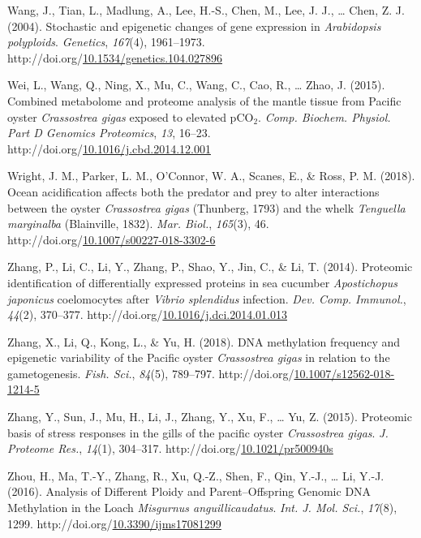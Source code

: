 \documentclass [11pt, proquest] {uwthesis}[2015/03/03]
\newlength{\cslhangindent}
\newenvironment{CSLReferences}%
{\setlength{\parindent}{0pt}%
\everypar{\setlength{\hangindent}{\cslhangindent}}\ignorespaces}%
{\par}
\begin{document}
\begin{CSLReferences}{1}{0}
\leavevmode\hypertarget{ref-Wang2004}{}%
Wang, J., Tian, L., Madlung, A., Lee, H.-S., Chen, M., Lee, J. J., \ldots{} Chen, Z. J. (2004). {Stochastic and epigenetic changes of gene expression in \emph{Arabidopsis polyploids}}. \emph{Genetics}, \emph{167}(4), 1961--1973. http://doi.org/\href{https://doi.org/10.1534/genetics.104.027896}{10.1534/genetics.104.027896}

\leavevmode\hypertarget{ref-Wei2015}{}%
Wei, L., Wang, Q., Ning, X., Mu, C., Wang, C., Cao, R., \ldots{} Zhao, J. (2015). {Combined metabolome and proteome analysis of the mantle tissue from Pacific oyster \emph{Crassostrea gigas} exposed to elevated {pCO\(_2\)}}. \emph{Comp. Biochem. Physiol. Part D Genomics Proteomics}, \emph{13}, 16--23. http://doi.org/\href{https://doi.org/10.1016/j.cbd.2014.12.001}{10.1016/j.cbd.2014.12.001}

\leavevmode\hypertarget{ref-Wright2018}{}%
Wright, J. M., Parker, L. M., O'Connor, W. A., Scanes, E., \& Ross, P. M. (2018). {Ocean acidification affects both the predator and prey to alter interactions between the oyster \emph{Crassostrea gigas} (Thunberg, 1793) and the whelk \emph{Tenguella marginalba} (Blainville, 1832)}. \emph{Mar. Biol.}, \emph{165}(3), 46. http://doi.org/\href{https://doi.org/10.1007/s00227-018-3302-6}{10.1007/s00227-018-3302-6}

\leavevmode\hypertarget{ref-Zhang2014}{}%
Zhang, P., Li, C., Li, Y., Zhang, P., Shao, Y., Jin, C., \& Li, T. (2014). {Proteomic identification of differentially expressed proteins in sea cucumber \emph{Apostichopus japonicus} coelomocytes after \emph{Vibrio splendidus} infection}. \emph{Dev. Comp. Immunol.}, \emph{44}(2), 370--377. http://doi.org/\href{https://doi.org/10.1016/j.dci.2014.01.013}{10.1016/j.dci.2014.01.013}

\leavevmode\hypertarget{ref-Zhang2018}{}%
Zhang, X., Li, Q., Kong, L., \& Yu, H. (2018). {DNA methylation frequency and epigenetic variability of the Pacific oyster \emph{Crassostrea gigas} in relation to the gametogenesis}. \emph{Fish. Sci.}, \emph{84}(5), 789--797. http://doi.org/\href{https://doi.org/10.1007/s12562-018-1214-5}{10.1007/s12562-018-1214-5}

\leavevmode\hypertarget{ref-Zhang2015}{}%
Zhang, Y., Sun, J., Mu, H., Li, J., Zhang, Y., Xu, F., \ldots{} Yu, Z. (2015). {Proteomic basis of stress responses in the gills of the pacific oyster \emph{Crassostrea gigas}}. \emph{J. Proteome Res.}, \emph{14}(1), 304--317. http://doi.org/\href{https://doi.org/10.1021/pr500940s}{10.1021/pr500940s}

\leavevmode\hypertarget{ref-Zhou2016}{}%
Zhou, H., Ma, T.-Y., Zhang, R., Xu, Q.-Z., Shen, F., Qin, Y.-J., \ldots{} Li, Y.-J. (2016). {Analysis of Different Ploidy and Parent--Offspring Genomic DNA Methylation in the Loach \emph{Misgurnus anguillicaudatus}}. \emph{Int. J. Mol. Sci.}, \emph{17}(8), 1299. http://doi.org/\href{https://doi.org/10.3390/ijms17081299}{10.3390/ijms17081299}

\end{CSLReferences}
\end{document}
